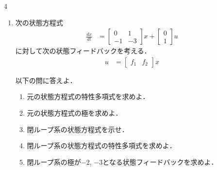 \documentclass[fleqn]{article}
\renewcommand{\bmatrix}{\left[\begin{array}}
\newcommand{\ematrix}{\end{array}\right]}
\begin{document}
\begin{multicols}{4}
\begin{enumerate}



\item
次の状態方程式
\begin{align}
	\frac{dx}{dt} 
	& =	\bmatrix{rr}
			0 & 1  \\
			-1 & -3 
		\ematrix
		x
		+
		\bmatrix{c}
			0 \\
			1
		\ematrix
		u 
\nonumber
\end{align}
に対して次の状態フィードバックを考える．
\begin{align}
	u & = \bmatrix{ccc} f_1 & f_2 \ematrix x
\nonumber
\end{align}

以下の問に答えよ．
\begin{enumerate}
\item
元の状態方程式の特性多項式を求めよ．
\vspace{3cm}

\item
元の状態方程式の極を求めよ．
\vspace{3cm}

\item
閉ループ系の状態方程式を示せ．
\vspace{4cm}

\item
閉ループ系の状態方程式の特性多項式を求めよ．
\vspace{3cm}

\item
閉ループ系の極が$-2$, $-3$となる状態フィードバックを求めよ．

\end{enumerate}
\vfill\null
\columnbreak








\end{enumerate}
\end{multicols}
\end{document}
